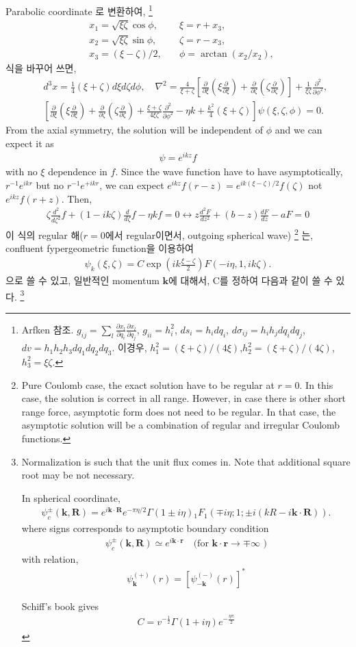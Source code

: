 \documentclass[10pt]{book}
\def\bm{\boldsymbol}
\newcommand{\bea}{\begin{eqnarray}}
\newcommand{\eea}{\end{eqnarray}}
\newcommand{\no}{\nonumber \\}
\newcommand{\del}{\partial}
\def\vk{{\bm k}}
\def\vr{{\bm r}}
\begin{document}
Parabolic coordinate 로 변환하여, 
\footnote{ Arfken 참조. 
$g_{ij}=\sum_l \frac{\del x_l}{\del q_i}\frac{\del x_l}{\del q_j}$,
$g_{ii}=h_i^2$, $ds_i=h_i dq_i$, 
$d\sigma_{ij}=h_i h_j dq_i dq_j$,
$dv=h_1 h_2 h_3 dq_1dq_2dq_3$. 이경우,
$h_1^2=(\xi+\zeta)/(4\xi)$,$h_2^2=(\xi+\zeta)/(4\zeta)$,
$h_3^2=\xi\zeta$.
}
\bea
&x_1=\sqrt{\xi\zeta}\cos\phi,\quad &\xi=r+x_3,\no
&x_2=\sqrt{\xi\zeta}\sin\phi,\quad &\zeta= r-x_3,\no
&x_3=(\xi-\zeta)/2,\quad &\phi= \arctan(x_2/x_2),
\eea
식을 바꾸어 쓰면, 
\bea
& &d^3 x=\frac{1}{4}(\xi+\zeta)d\xi d\zeta d\phi, \quad
\nabla^2=\frac{4}{\xi+\zeta}\left[ \frac{\del}{\del\xi}(\xi\frac{\del}{\del\xi})
+\frac{\del}{\del \zeta}(\zeta\frac{\del}{\del\zeta})
\right]+\frac{1}{\xi\zeta}\frac{\del^2}{\del\phi^2},\no
& &\left[
\frac{\del}{\del\xi}(\xi\frac{\del}{\del\xi})
+\frac{\del}{\del \zeta}(\zeta\frac{\del}{\del\zeta})
+\frac{\xi+\zeta}{4\xi\zeta}\frac{\del^2}{\del\phi^2}
-\eta k+\frac{k^2}{4}(\xi+\zeta)
\right]\psi(\xi,\zeta,\phi)=0.
\eea
From the axial symmetry, the solution will be independent of $\phi$ and
we can expect it as
\bea
\psi=e^{ikz} f
\eea 
with no $\xi$ dependence in $f$. Since the wave function have to have asymptotically,
$r^{-1}e^{ikr}$ but no $r^{-1}e^{+ikr}$, we can expect $e^{ikz}f(r-z)=e^{ik(\xi-\zeta)/2}f(\zeta)$  not $e^{ikz}f(r+z)$.
Then,
\bea 
\zeta\frac{d^2}{d\zeta^2}f+(1-ik\zeta)\frac{d}{d\zeta}f-\eta k f=0 \leftrightarrow 
 z\frac{d^2 F}{dz^2}+(b-z)\frac{dF}{dz}-aF=0
\eea 
이 식의 regular 해($r=0$에서 regular이면서, 
outgoing spherical wave)
\footnote{
Pure Coulomb case, the exact solution have to be regular
at $r=0$. In this case, the solution is correct in all range.
However, in case there is other
short range force, 
asymptotic form does not need to be regular.
In that case, the asymptotic solution will be a combination of
regular and irregular Coulomb functions.
}
는, confluent fypergeometric function을 이용하여
\bea
\psi_k(\xi,\zeta)= C \exp(ik\frac{\xi-\zeta}{2}) F(-i\eta,1, ik\zeta).
\eea 
으로 쓸 수 있고, 일반적인 momentum $\vk$에 대해서, C를 정하여
다음과 같이 쓸 수 있다.
\footnote{ Normalization is such that the unit flux comes in. 
Note that additional square root may be not necessary.
	
In spherical coordinate,
\bea
\psi^{\pm}_c({\bm k},{\bm R})
=e^{i\vk\cdot{\bm R}}e^{-\pi\eta/2}\Gamma(1\pm i\eta)
 {}_1F_1(\mp i\eta;1;\pm i (kR-i{\bm k}\cdot{\bm R}) ).
\eea
where signs corresponds to asymptotic boundary condition
\bea 
\psi^{\pm}_c({\bm k},{\bm R})\simeq e^{i\vk\cdot\vr} \quad 
      \mbox{(for $\vk\cdot\vr\to \mp \infty $ )} 
\eea 
with relation,
\bea 
\psi^{(+)}_\vk(r)=[\psi^{(-)}_{-\vk}(r)]^*
\eea 

Schiff's book gives
\bea 
C=v^{-\frac{1}{2}}\Gamma(1+i\eta)e^{-\frac{\eta\pi}{2}}
\eea 
}
\end{document}
